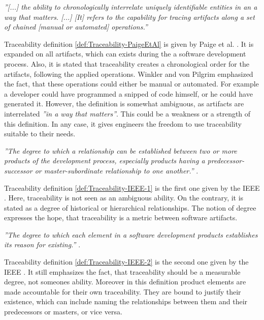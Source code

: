 \documentclass[runningheads,a4paper]{llncs}
\begin{document}
\begin{definition}
\label{def:Traceability-PaigeEtAl}
\textit{''[...] the ability to chronologically interrelate uniquely identifiable entities in an a way that matters. [...] [It] refers to the capability for tracing artifacts along a set of chained [manual or automated] operations.''} \cite{TraceabilitySurvey}
\end{definition}
Traceability definition \ref{def:Traceability-PaigeEtAl} is given by Paige et al. \cite{PaigeEtAl}.
It is expanded on all artifacts, which can exists during the a software development process.
Also, it is stated that traceability creates a chronological order for the artifacts, following the applied operations.
Winkler and von Pilgrim emphasized the fact, that these operations could either be manual or automated.
For example a developer could have programmed a snipped of code himself, or he could have generated it.
However, the definition is somewhat ambiguous, as artifacts are interrelated \textit{''in a way that matters''}.
This could be a weakness or a strength of this definition.
In any case, it gives engineers the freedom to use traceability suitable to their needs.


\begin{definition}
\label{def:Traceability-IEEE-1}
\textit{''The degree to which a relationship can be established between two or more products of the development process, especially products having a predecessor-successor or master-subordinate relationship to one another.''} \cite{IEEEGlossary}.
\end{definition}
Traceability definition \ref{def:Traceability-IEEE-1} is the first one given by the IEEE \cite{IEEEGlossary}.
Here, traceability is not seen as an ambiguous ability.
On the contrary, it is stated as a degree of historical or hierarchical relationships. 
The notion of degree expresses the hope, that traceability is a metric between software artifacts.


\begin{definition}
\label{def:Traceability-IEEE-2}
\textit{''The degree to which each element in a software development products establishes its reason for existing.''} \cite{IEEEGlossary}.
\end{definition}
Traceability definition \ref{def:Traceability-IEEE-2} is the second one given by the IEEE \cite{IEEEGlossary}.
It still emphasizes the fact, that traceability should be a measurable degree, not someones ability.
Moreover in this definition product elements are made accountable for their own traceability.
They are bound to justify their existence, which can include naming the relationships between them and their predecessors or masters, or vice versa.
\end{document}
